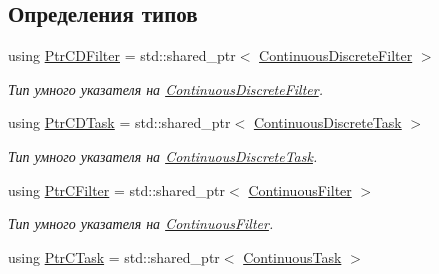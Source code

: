 \subsection*{Определения типов}
\begin{DoxyCompactItemize}
\item 
using \hyperlink{namespace_core_a70dec7db05bb1e9e8d105d188633fe91}{Ptr\+C\+D\+Filter} = std\+::shared\+\_\+ptr$<$ \hyperlink{class_core_1_1_continuous_discrete_filter}{Continuous\+Discrete\+Filter} $>$\hypertarget{namespace_core_a70dec7db05bb1e9e8d105d188633fe91}{}\label{namespace_core_a70dec7db05bb1e9e8d105d188633fe91}

\begin{DoxyCompactList}\small\item\em Тип умного указателя на \hyperlink{class_core_1_1_continuous_discrete_filter}{Continuous\+Discrete\+Filter}. \end{DoxyCompactList}\item 
using \hyperlink{namespace_core_a4d5939b0284102299f3fb63d7552826a}{Ptr\+C\+D\+Task} = std\+::shared\+\_\+ptr$<$ \hyperlink{class_core_1_1_continuous_discrete_task}{Continuous\+Discrete\+Task} $>$\hypertarget{namespace_core_a4d5939b0284102299f3fb63d7552826a}{}\label{namespace_core_a4d5939b0284102299f3fb63d7552826a}

\begin{DoxyCompactList}\small\item\em Тип умного указателя на \hyperlink{class_core_1_1_continuous_discrete_task}{Continuous\+Discrete\+Task}. \end{DoxyCompactList}\item 
using \hyperlink{namespace_core_a83a912e3fc57bd838d6ddc39895999f3}{Ptr\+C\+Filter} = std\+::shared\+\_\+ptr$<$ \hyperlink{class_core_1_1_continuous_filter}{Continuous\+Filter} $>$\hypertarget{namespace_core_a83a912e3fc57bd838d6ddc39895999f3}{}\label{namespace_core_a83a912e3fc57bd838d6ddc39895999f3}

\begin{DoxyCompactList}\small\item\em Тип умного указателя на \hyperlink{class_core_1_1_continuous_filter}{Continuous\+Filter}. \end{DoxyCompactList}\item 
using \hyperlink{namespace_core_a95543587a560c6c497c6cadf68e03a62}{Ptr\+C\+Task} = std\+::shared\+\_\+ptr$<$ \hyperlink{class_core_1_1_continuous_task}{Continuous\+Task} $>$\hypertarget{namespace_core_a95543587a560c6c497c6cadf68e03a62}{}\label{namespace_core_a95543587a560c6c497c6cadf68e03a62}


\end{DoxyCompactItemize}
